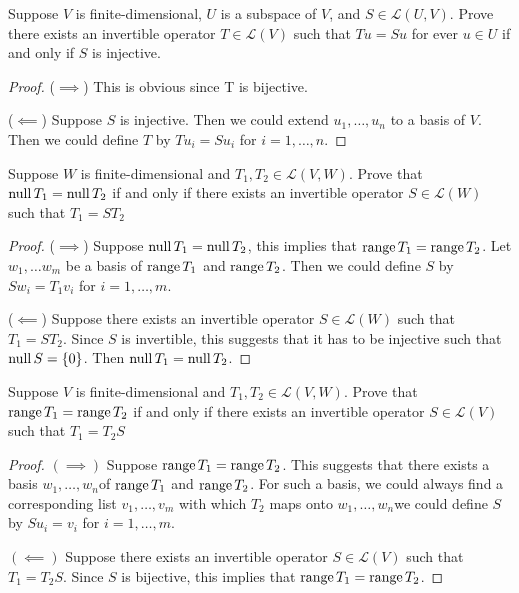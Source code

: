 \begin{exercise}
Suppose $V$ is finite-dimensional, $U $ is a subspace of $V$, and $S \in \mathcal{L}(U,V)$. Prove there exists an invertible operator $T \in \mathcal{L}(V)$ such that $Tu = Su$ for ever $u \in U$ if and only if $S$ is injective.
\end{exercise}
\begin{proof}
	($\implies$) This is obvious since T is bijective.

	($\impliedby$) Suppose $S$ is injective. Then we could extend $u_1, \ldots , u_n$ to a basis of $V$. Then we could define $T$ by $Tu_i = Su_i$ for $i = 1, \ldots , n$.
\end{proof}

\begin{exercise}
Suppose $W$ is finite-dimensional and $T_1,T_2 \in \mathcal{L}(V,W)$. Prove that $\mathop{\mathrm{null}} T_1 = \mathop{\mathrm{null}} T_2$ if and only if there exists an invertible operator $S \in \mathcal{L}(W)$ such that $T_1 = ST_2$
\end{exercise}
\begin{proof}
	($\implies$) Suppose $\mathop{\mathrm{null}} T_1 = \mathop{\mathrm{null}} T_2$, this implies that $\mathop{\mathrm{range}} T_1 = \mathop{\mathrm{range}} T_2$. Let $w_1, \ldots w_m$ be a basis of $\mathop{\mathrm{range}} T_1$ and $\mathop{\mathrm{range}} T_2$. Then we could define $S$ by $Sw_i = T_1v_i$ for $i = 1, \ldots , m$.

	($\impliedby$) Suppose there exists an invertible operator $S \in \mathcal{L}(W)$ such that $T_1 = ST_2$. Since $S$ is invertible, this suggests that it has to be injective such that $\mathop{\mathrm{null}} S = \{0\}$. Then $\mathop{\mathrm{null}} T_1 = \mathop{\mathrm{null}} T_2$.
\end{proof}

\newpage

\begin{exercise}
Suppose $V$ is finite-dimensional and $T_1, T_2 \in \mathcal{L}(V,W)$. Prove that $\mathop{\mathrm{range}} T_1 = \mathop{\mathrm{range}} T_2$ if and only if there exists an invertible operator $S \in \mathcal{L}(V)$ such that $T_1 = T_2S$
\end{exercise}
\begin{proof}
	$(\implies)$ Suppose $\mathop{\mathrm{range}} T_1 = \mathop{\mathrm{range}} T_2$. This suggests that there exists a basis $w_1, \ldots ,w_n$of $\mathop{\mathrm{range}} T_1$ and $\mathop{\mathrm{range}} T_2$. For such a basis, we could always find a corresponding list $v_1, \ldots ,v_m$ with which $T_2$ maps onto $w_1, \ldots ,w_n$we could define $S$ by $Su_i = v_i$ for $i = 1, \ldots, m$.

	$(\impliedby)$ Suppose there exists an invertible operator $S \in \mathcal{L}(V)$ such that $T_1 = T_2S$. Since $S$ is bijective, this implies that $\mathop{\mathrm{range}} T_1 = \mathop{\mathrm{range}} T_2$.
\end{proof}

